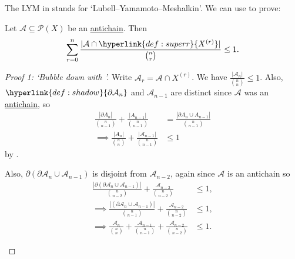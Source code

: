 \documentclass{article}
\let\subset\subseteq
\begin{document}
The LYM in  stands for `Lubell–Yamamoto–Meshalkin'.
We can use  to prove:
\begin{nthm}[LYM]\label{thm:lym3}
  Let $\mathcal{A} \subset \mathcal{P}(X)$ be an \hyperlink{def:antichain}{antichain}.
  Then
  \begin{equation*}
    \sum_{r=0}^n \frac{|\mathcal{A} \cap \hyperlink{def:superr}{X^{(r)}}|}{\binom{n}{r}} \leq 1.
  \end{equation*}
\end{nthm}
\begin{proof}[Proof 1: `Bubble down with ']
  Write $\mathcal{A}_r = \mathcal{A} \cap X^{(r)}$.
  We have $\frac{|\mathcal{A}_n|}{\binom{n}{n}} \leq 1$.
  Also, $\hyperlink{def:shadow}{\partial \mathcal{A}_n}$ and $\mathcal{A}_{n-1}$ are distinct since $\mathcal{A}$ was an \hyperlink{def:antichain}{antichain}, so
  \begin{align*}
    \frac{|\partial A_n|}{\binom{n}{n-1}} + \frac{|A_{n-1}|}{\binom{n}{n-1}} &= \frac{|\partial A_n \cup A_{n-1}|}{\binom{n}{n-1}} \\
    \implies \frac{|A_n|}{\binom{n}{n}} + \frac{|\mathcal{A}_{n-1}|}{\binom{n}{n-1}} &\leq 1
  \end{align*}
  by .

  Also, $\partial(\partial \mathcal{A}_n \cup \mathcal{A}_{n-1})$ is disjoint from $\mathcal{A}_{n-2}$, again since $\mathcal{A}$ is an antichain so
  \begin{align*}
    \frac{|\partial(\partial \mathcal{A}_n \cup \mathcal{A}_{n-1})|}{\binom{n}{n-2}} + \frac{\mathcal{A}_{n-2}}{{n \choose n-2}} &\leq 1, \\
    \implies \frac{|(\partial \mathcal{A}_n \cup \mathcal{A}_{n-1})|}{\binom{n}{n-1}} + \frac{\mathcal{A}_{n-2}}{{n \choose n-2}} &\leq 1, \\
    \implies \frac{\mathcal{A}_n}{\binom{n}{n}} + \frac{\mathcal{A}_{n-1}}{\binom{n}{n-1}} + \frac{\mathcal{A}_{n-2}}{\binom{n}{n-2}} &\leq 1.
  \end{align*}
  \begin{center}
\end{center}
\end{proof}
\end{document}
